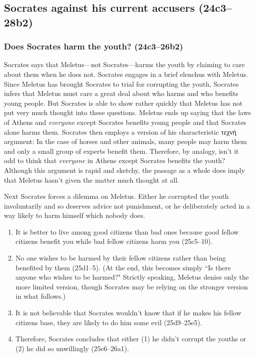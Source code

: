 \documentclass[11pt]{article}
\begin{document}



\subsection{Socrates against his current accusers (24c3--28b2)}

\subsubsection{Does Socrates harm the youth? (24c3--26b2)}

Socrates says that Meletus---not Socrates---harms the youth by claiming to care about them when he does not. Socrates engages in a brief elenchus with Meletus.  Since Meletus has brought Socrates to trial for corrupting the youth, Socrates infers that Meletus must care a great deal about who harms and who benefits young people. But Socrates is able to show rather quickly that Meletus has not put very much thought into these questions.  Meletus ends up saying that the laws of Athens and \emph{everyone} except Socrates benefits young people and that Socrates alone harms them.  Socrates then employs a version of his characteristic {\g τεχνή} argument: In the case of horses and other animals, many people may harm them and only a small group of experts benefit them. Therefore, by analogy, isn't it odd to think that \emph{everyone} in Athens except Socrates benefits the youth?  Although this argument is rapid and sketchy, the passage as a whole does imply that Meletus hasn't given the matter much thought at all.

Next Socrates forces a dilemma on Meletus. Either he corrupted the youth involuntarily and so deserves advice not punishment, or he deliberately acted in a way likely to harm himself which nobody does.

\begin{enumerate}
    \item It is better to live among good citizens than bad ones because good fellow citizens benefit you while bad fellow citizens harm you (25c5--10).
    \item No one wishes to be harmed by their fellow citizens rather than being benefited by them (25d1--5). (At the end, this becomes simply ``Is there anyone who wishes to be harmed?" Strictly speaking, Meletus denies only the more limited version, though Socrates may be relying on the stronger version in what follows.)
    \item It is not believable that Socrates wouldn't know that if he makes his fellow citizens base, they are likely to do him some evil (25d9--25e5).
    \item Therefore, Socrates concludes that either (1) he didn't corrupt the youths or (2) he did so unwillingly (25e6--26a1).
\end{enumerate}
\end{document}
